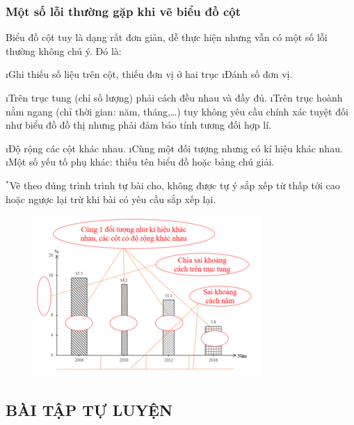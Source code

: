 \subsubsection*{Một số lỗi thường gặp khi vẽ biểu đồ cột}
Biểu đồ cột tuy là dạng rất đơn giản, dễ thực hiện nhưng vẫn có một số lỗi thường không chú ý. Đó là:
\begin{enumerate}[--,leftmargin=*]
	\i Ghi thiếu số liệu trên cột, thiếu đơn vị ở hai trục
	\i Đánh số đơn vị.
	\begin{enumerate}[+,leftmargin=*]
		\i Trên trục tung (chỉ số lượng) phải cách đều nhau và đầy đủ.
		\i Trên trục hoành nằm ngang (chỉ thời gian: năm, tháng,\ldots) tuy  không yêu cầu chính xác tuyệt đối như biểu đồ đồ thị nhưng phải đảm bảo tính tương đối hợp lí.
	\end{enumerate}
	\i Độ rộng các cột khác nhau.
	\i Cùng một đối tượng nhưng có kí hiệu khác nhau.
	\i Một số yếu tố phụ khác: thiếu tên biểu đồ hoặc bảng chú giải.
\end{enumerate}
$^*$Vẽ theo đúng trình trình tự bài cho, không được tự ý sắp xếp từ thấp tới cao hoặc ngược lại trừ khi bài có yêu  cầu sắp xếp lại.
\begin{figure}[H]
	\centering
	\vspace*{-5pt}
	\captionsetup{labelformat= empty, justification=centering}
	\includegraphics[width=0.5\linewidth]{7}
	\vspace*{-10pt}
\end{figure}
\subsection{BÀI TẬP TỰ LUYỆN} 
